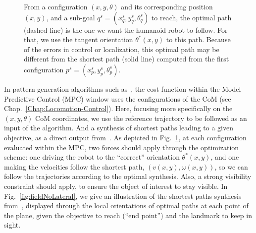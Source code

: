 \begin{figure}[h]
\centering
 \hspace{2cm}
\caption{From a configuration $(x,y,\theta)$ and its corresponding position $(x,y)$, and a sub-goal $q^s= (x_q^s,y_q^s,\theta_q^s)$ to reach, the optimal path (dashed line) is the one we want the humanoid robot to follow. For that, we use the tangent orientation $\theta^*(x,y)$ to this path. Because of the errors in control or localization, this optimal path may be different from the shortest path (solid line) computed from the first configuration $p^s= (x_p^s,y_p^s,\theta_p^s)$.
\label{fig:paths}}
\end{figure}

In pattern generation algorithms such as~\citep{HerdtAR2010}, the cost function within the Model Predictive Control (MPC) window uses the configurations of the CoM (see Chap.~\ref{Chap:Locomotion-Control}). Here, focusing more specifically on the $(x,y,\theta)$ CoM coordinates, we use the reference trajectory to be followed as an input of the algorithm. And a synthesis of shortest paths leading to a given objective, as a direct output from~\citep{Salaris:2010}. As depicted in Fig.~\ref{fig:paths}, at each configuration evaluated within the MPC, two forces should apply through the optimization scheme: one driving the robot to the ``correct'' orientation $\theta^*(x,y)$, and one making the velocities follow the shortest path, $(v(x,y),\omega(x,y))$, so we can follow the trajectories according to the optimal synthesis. Also, a strong visibility constraint should apply, to ensure the object of interest to stay visible. In Fig.~\ref{fig:fieldNoLateral}, we give an illustration of the shortest paths synthesis from~\citep{Salaris:2010}, displayed through the local orientations of optimal paths at each point of the plane, given the objective to reach (``end point'') and the landmark to keep in sight. 



